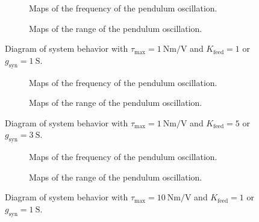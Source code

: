 \begin{figure}[!htbp]
    \centering
    \begin{subfigure}[t][.46\textheight][b]{\textwidth}
        \centering
        \caption{Maps of the frequency of the pendulum oscillation.}
        \label{fig:single_t1_low_freq}
    \end{subfigure}
    
    \begin{subfigure}[b][.46\textheight][t]{\textwidth}
        \centering
        \caption{Maps of the range of the pendulum oscillation.}
        \label{fig:single_t1_low_range}
    \end{subfigure}
    \caption{Diagram of system behavior with $\tau_\text{max} = \qty{1}{\newton\meter\per\volt}$ and $K_\text{feed} = 1$ or $g_{\text{syn}} = \qty{1}{\siemens}$.}
    \label{fig:single_t1_low}
\end{figure}

\begin{figure}[!htbp]
    \centering
    \begin{subfigure}[t][.46\textheight][b]{\textwidth}
        \centering
        \caption{Maps of the frequency of the pendulum oscillation.}
        \label{fig:single_t1_high_freq}  
    \end{subfigure}
    
    \begin{subfigure}[b][.46\textheight][t]{\textwidth}
        \centering
        \caption{Maps of the range of the pendulum oscillation.}
        \label{fig:single_t1_high_range}  
    \end{subfigure}
    \caption{Diagram of system behavior with $\tau_\text{max}=\qty{1}{\newton\meter\per\volt}$ and $K_\text{feed} = 5$ or $g_{\text{syn}} = \qty{3}{\siemens}$.}
    \label{fig:single_t1_high}
\end{figure}

\begin{figure}[!htbp]
    \centering
    \begin{subfigure}[t][.46\textheight][b]{\textwidth}
        \centering
        \caption{Maps of the frequency of the pendulum oscillation.}
        \label{fig:single_t10_low_freq}
    \end{subfigure}
    
    \begin{subfigure}[b][.46\textheight][t]{\textwidth}
        \centering
        \caption{Maps of the range of the pendulum oscillation.}
        \label{fig:single_t10_low_range}
    \end{subfigure}
    \caption{Diagram of system behavior with $\tau_\text{max}=\qty{10}{\newton\meter\per\volt}$ and $K_\text{feed} = 1$ or $g_{\text{syn}} = \qty{1}{\siemens}$.}
    \label{fig:single_t10_low}
\end{figure}

